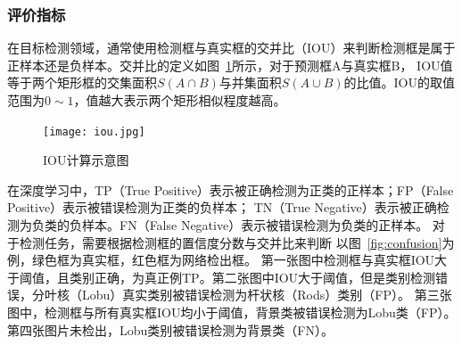 \subsubsection{评价指标}
\label{section:metrics}

在目标检测领域，通常使用检测框与真实框的交并比（IOU）来判断检测框是属于正样本还是负样本。交并比的定义如图~\ref{fig:iou}所示，对于预测框A与真实框B，
IOU值等于两个矩形框的交集面积$S(A \cap B)$与并集面积$S(A \cup B)$的比值。IOU的取值范围为$0 \sim 1$，值越大表示两个矩形相似程度越高。
\begin{figure}[htbp]                     
  \centering                      
  \texttt{[image: iou.jpg]}                      
  \caption{IOU计算示意图}                      
  \label{fig:iou}       
\end{figure}   

在深度学习中，TP（True Positive）表示被正确检测为正类的正样本；FP（False Positive）表示被错误检测为正类的负样本；
TN（True Negative）表示被正确检测为负类的负样本。FN（False Negative）表示被错误检测为负类的正样本。
对于检测任务，需要根据检测框的置信度分数与交并比来判断
以图~\ref{fig:confusion}为例，绿色框为真实框，红色框为网络检出框。
第一张图中检测框与真实框IOU大于阈值，且类别正确，为真正例TP。第二张图中IOU大于阈值，但是类别检测错误，分叶核（Lobu）真实类别被错误检测为杆状核（Rods）类别（FP）。
第三张图中，检测框与所有真实框IOU均小于阈值，背景类被错误检测为Lobu类（FP）。第四张图片未检出，Lobu类别被错误检测为背景类（FN）。

